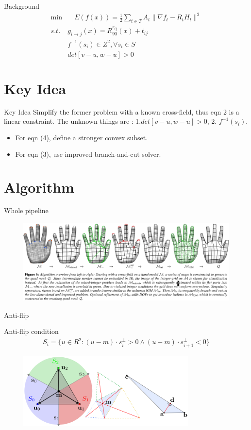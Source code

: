 \documentclass{beamer}
\begin{document}
\begin{frame}{Background}
\begin{eqnarray}
\min &\quad E(f(x))=\frac{1}{2}\sum_{t\in T}A_t\|\nabla f_t - R_tH_t\|^2\\
s.t. &g_{i\to j}(x) = R_{90}^{r_{ij}}(x)+t_{ij} \\
& f^{-1}(s_i) \in Z^2, \forall s_i\in S\\
&det[v-u,w-u] > 0
\end{eqnarray}
\end{frame}

\section{Key Idea}
\begin{frame}{Key Idea}
Simplify the former problem with a known cross-field, thus eqn 2 is a linear constraint. The unknown things
are : 1.$det[v-u,w-u]>0$,  2. $f^{-1}(s_i)$.
\begin{itemize}
\item For eqn (4), define a stronger convex subset.
\item For eqn (3), use improved branch-and-cut solver.
\end{itemize}
\end{frame}

\section{Algorithm}
\begin{frame}{Whole pipeline}
\begin{figure}
\centering
\includegraphics[height=1.7in]{./img/pipeline.png}
\end{figure}
\end{frame}


\begin{frame}{Anti-flip}
\begin{block}{Anti-flip condition}
\begin{eqnarray}
S_i=\{u\in R^2: (u-m)\cdot s_i^{\perp}>0 \land (u-m)\cdot s_{i+1}^{\perp}<0\}
\end{eqnarray}
\end{block}
\begin{figure}[!htb]
\includegraphics[height=1.5in]{./img/anti-flip.png}
\end{figure}
\end{frame}
\end{document}
